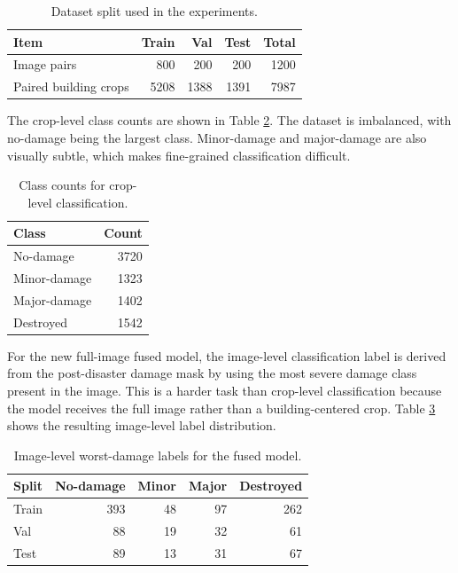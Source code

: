 \documentclass[10pt,conference]{IEEEtran}
\begin{document}
\begin{table}[t]
    \centering
    \caption{Dataset split used in the experiments.}
    \label{tab:dataset}
    \begin{tabular}{lrrrr}
        \toprule
        Item & Train & Val & Test & Total \\
        \midrule
        Image pairs & 800 & 200 & 200 & 1200 \\
        Paired building crops & 5208 & 1388 & 1391 & 7987 \\
        \bottomrule
    \end{tabular}
\end{table}

The crop-level class counts are shown in Table \ref{tab:crop_classes}. The dataset is imbalanced, with no-damage being the largest class. Minor-damage and major-damage are also visually subtle, which makes fine-grained classification difficult.

\begin{table}[t]
    \centering
    \caption{Class counts for crop-level classification.}
    \label{tab:crop_classes}
    \begin{tabular}{lr}
        \toprule
        Class & Count \\
        \midrule
        No-damage & 3720 \\
        Minor-damage & 1323 \\
        Major-damage & 1402 \\
        Destroyed & 1542 \\
        \bottomrule
    \end{tabular}
\end{table}

For the new full-image fused model, the image-level classification label is derived from the post-disaster damage mask by using the most severe damage class present in the image. This is a harder task than crop-level classification because the model receives the full image rather than a building-centered crop. Table \ref{tab:image_classes} shows the resulting image-level label distribution.

\begin{table}[t]
    \centering
    \caption{Image-level worst-damage labels for the fused model.}
    \label{tab:image_classes}
    \begin{tabular}{lrrrr}
        \toprule
        Split & No-damage & Minor & Major & Destroyed \\
        \midrule
        Train & 393 & 48 & 97 & 262 \\
        Val & 88 & 19 & 32 & 61 \\
        Test & 89 & 13 & 31 & 67 \\
        \bottomrule
    \end{tabular}
\end{table}
\end{document}
